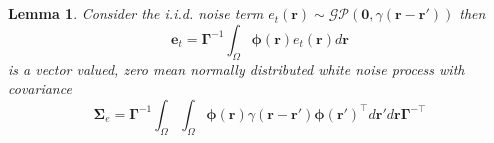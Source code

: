 \documentclass[twocolumn,11pt,a4paper]{article}		%
\newcommand{\dean}[1]{\textsf{\emph{\textbf{\textcolor{green}{#1}}}}}
\begin{document}
\section{}\label{ColoredNoise} 
\newtheorem{lemma}{Lemma} 
\begin{lemma}
	Consider the i.i.d. noise term $e_t(\mathbf{r})\sim\mathcal{GP}(\mathbf 0,\gamma(\mathbf{r}-\mathbf{r'}))$ then 
	\begin{equation}\label{eq:AppendixWt} 
		\mathbf e_t=\boldsymbol{\Gamma}^{-1}\int_\Omega {\boldsymbol{\phi} ( \mathbf{r} )e_t( \mathbf{r} )d\mathbf{r}} 
	\end{equation}
	is a vector valued, zero mean normally distributed white noise process with covariance 
	\begin{equation}
		\boldsymbol\Sigma_e =\mathbf{\Gamma}^{-1}\int_{\Omega}\int_{\Omega}\boldsymbol{\phi}\left(\mathbf r\right) \gamma\left(\mathbf r- \mathbf r' \right)\boldsymbol{\phi}\left(\mathbf r'\right)^{\top}d\mathbf r' d\mathbf r\mathbf{\Gamma}^{- \top} 
	\end{equation}
	\label{lemma:FieldCovariance} 
\end{lemma}
\end{document}
